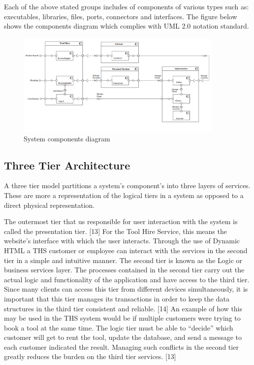 \documentclass[fontsize=11pt]{extarticle}
\numberwithin{figure}{section} %
\numberwithin{table}{section}%
\begin{document}
Each of the above stated groups includes of components of various types
such as: executables, libraries, files, ports, connectors and
interfaces. The figure below shows the components diagram which complies
with UML 2.0 notation standard.

\begin{figure}[H]
      \centering
      \includegraphics[trim = 0 0 0 0, clip, width=0.9\textwidth]{TempImg/compD.png}
      \caption{System components diagram}
\end{figure}

\hypertarget{three-tier-architecture}{%
\subsection{Three Tier Architecture}\label{three-tier-architecture}}

A three tier model partitions a system's component's into three layers
of services. These are more a representation of the logical tiers in a
system as opposed to a direct physical representation.

The outermost tier that us responsible for user interaction with the
system is called the presentation tier. {[}13{]} For the Tool Hire
Service, this means the website's interface with which the user
interacts. Through the use of Dynamic HTML a THS customer or employee
can interact with the services in the second tier in a simple and
intuitive manner. The second tier is known as the Logic or business
services layer. The processes contained in the second tier carry out the
actual logic and functionality of the application and have access to the
third tier. Since many clients can access this tier from different
devices simultaneously, it is important that this tier manages its
transactions in order to keep the data structures in the third tier
consistent and reliable. {[}14{]} An example of how this may be used in
the THS system would be if multiple customers were trying to book a tool
at the same time. The logic tier must be able to ``decide'' which
customer will get to rent the tool, update the database, and send a
message to each customer indicated the result. Managing such conflicts
in the second tier greatly reduces the burden on the third tier
services. {[}13{]}
\end{document}
